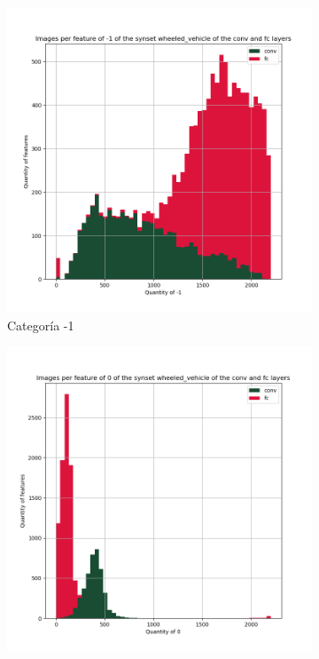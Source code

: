 \documentclass[12,twoside]{TFG-GM}
\theoremstyle{definition}
\theoremstyle{remark}
\begin{document}
\begin{figure}[ht] 
	\centering
	\begin{subfigure}[b]{0.3\textwidth}
		\includegraphics[width=\textwidth] {Images/plots/25/synsets/Images_per_feature_of_-1_category_wheeled_vehicleall_layers.png}
		\caption{Categoría -1}
	\end{subfigure}
	\begin{subfigure}[b]{0.3\textwidth}
		\includegraphics[width=\textwidth]  {Images/plots/25/synsets/Images_per_feature_of_0_category_wheeled_vehicleall_layers.png}

\end{subfigure}
\end{figure}
\end{document}
